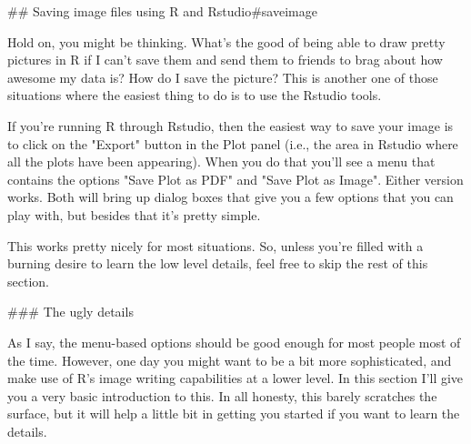 ## Saving image files using R and Rstudio{#saveimage}

Hold on, you might be thinking. What's the good of being able to draw pretty pictures in R if I can't save them and send them to friends to brag about how awesome my data is? How do I save the picture? This is another one of those situations where the easiest thing to do is to use the Rstudio tools.

If you're running R through Rstudio, then the easiest way to save your image is to click on the "Export" button in the Plot panel (i.e., the area in Rstudio where all the plots have been appearing). When you do that you'll see a menu that contains the options "Save Plot as PDF" and "Save Plot as Image". Either version works. Both will bring up dialog boxes that give you a few options that you can play with, but besides that it's pretty simple. 

This works pretty nicely for most situations. So, unless you're filled with a burning desire to learn the low level details, feel free to skip the rest of this section.

### The ugly details \advanced 

As I say, the menu-based options should be good enough for most people most of the time. However, one day you might want to be a bit more sophisticated, and make use of R's image writing capabilities at a lower level. In this section I'll give you a very basic introduction to this. In all honesty, this barely scratches the surface, but it will help a little bit in getting you started if you want to learn the details. 

